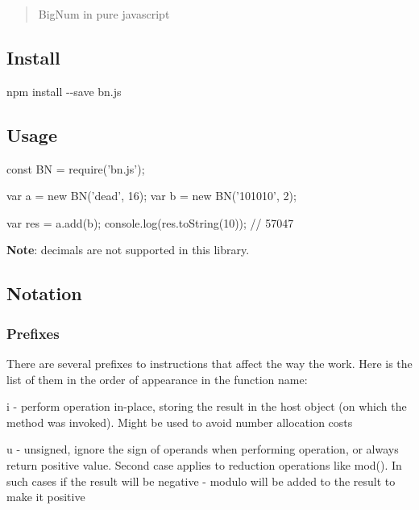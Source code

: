 \begin{quote}
Big\+Num in pure javascript \end{quote}


\href{http://travis-ci.org/indutny/bn.js}{\tt }

\subsection*{Install}

{\ttfamily npm install -\/-\/save bn.\+js}

\subsection*{Usage}


\begin{DoxyCode}
const BN = require('bn.js');

var a = new BN('dead', 16);
var b = new BN('101010', 2);

var res = a.add(b);
console.log(res.toString(10));  // 57047
\end{DoxyCode}


{\bfseries Note}\+: decimals are not supported in this library.

\subsection*{Notation}

\subsubsection*{Prefixes}

There are several prefixes to instructions that affect the way the work. Here is the list of them in the order of appearance in the function name\+:


\begin{DoxyItemize}
\item {\ttfamily i} -\/ perform operation in-\/place, storing the result in the host object (on which the method was invoked). Might be used to avoid number allocation costs
\item {\ttfamily u} -\/ unsigned, ignore the sign of operands when performing operation, or always return positive value. Second case applies to reduction operations like {\ttfamily mod()}. In such cases if the result will be negative -\/ modulo will be added to the result to make it positive
\end{DoxyItemize}

